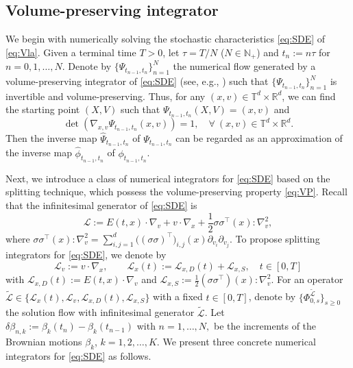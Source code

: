 \documentclass[11pt,reqno]{amsproc}
\newcommand{\R}{\mathbb{R}}
\numberwithin{equation}{section}
\begin{document}
\subsection{Volume-preserving integrator}\label{S3.1}
We begin with numerically solving the stochastic characteristics \eqref{eq:SDE} of \eqref{eq:Vla}. 
Given a terminal time $T>0$,
let $\tau=T/N$ ($N\in\mathbb{N}_+$) and $t_n:=n\tau$ for $n=0,1,\ldots,N$. Denote by $\{\Psi_{t_{n-1},t_n}\}_{n=1}^N$ the numerical flow generated by a volume-preserving integrator of \eqref{eq:SDE} (see, e.g., \cite[section VI.9]{HLW02}) such that $\{\Psi_{t_{n-1},t_n}\}_{n=1}^N$ is invertible and volume-preserving. Thus, for any $(x,v)\in\mathbb{T}^d\times\mathbb R^d$, we can find the starting point $(X,V)$ such that $\Psi_{t_{n-1},t_n}(X,V)=(x,v)$ and
	\begin{equation}\label{eq:VP}
	\det\left(\nabla_{x,v}\Psi_{t_{n-1},t_n}(x,v)\right)=1,\quad \forall~(x,v)\in\mathbb{T}^d\times\R^d. 
	\end{equation}
	Then the inverse map $\widehat{\Psi}_{t_{n-1},t_n}$ of $\Psi_{t_{n-1},t_n}$ can be regarded as an approximation of the inverse map $\widehat{\phi}_{t_{n-1},t_n}$ of $\phi_{t_{n-1},t_n}$. 

Next, we introduce a class of numerical integrators for \eqref{eq:SDE} based on the splitting technique, which possess 
 the volume-preserving property \eqref{eq:VP}. Recall that the infinitesimal generator of \eqref{eq:SDE} is 
$$\mathcal L:= E(t,x)\cdot \nabla_v+v\cdot\nabla_x+\frac12\sigma\sigma^\top(x):\nabla_v^2,$$
where $\sigma\sigma^\top(x):\nabla_v^2=\sum_{i,j=1}^d\big((\sigma\sigma)^\top\big)_{i,j}(x)\partial_{v_i}\partial_{v_j}$. 
To propose splitting integrators for \eqref{eq:SDE}, we denote by
\begin{equation*}
\mathcal L_{v}:= v\cdot\nabla_x,\qquad
\mathcal L_{x}(t):=\mathcal L_{x,D}(t)+\mathcal L_{x,S},\quad t\in[0,T]
\end{equation*}
with $\mathcal L_{x,D}(t):= E(t,x)\cdot \nabla_v$ and $\mathcal L_{x,S}:=\frac12(\sigma\sigma^\top)(x):\nabla_v^2$.
For an operator $\tilde{\mathcal{L}}\in\{\mathcal{L}_{x}(t),\mathcal{L}_{v},\mathcal{L}_{x,D}(t),\mathcal{L}_{x,S}\}$ with a fixed $t\in[0,T]$, denote by 
 $\{\Phi^{\tilde{\mathcal{L}}}_{0,s}\}_{s\ge0}$ the solution flow 
 with infinitesimal generator $\tilde{\mathcal{L}}$. 
 Let $\delta\beta_{n,k}:=\beta_k(t_{n})-\beta_k(t_{n-1})$ with $n=1,\ldots,N,$ be the increments of the Brownian motions $\beta_k$, $k=1,2,\ldots,K$. We present three concrete numerical integrators for \eqref{eq:SDE} as follows.
\end{document}
